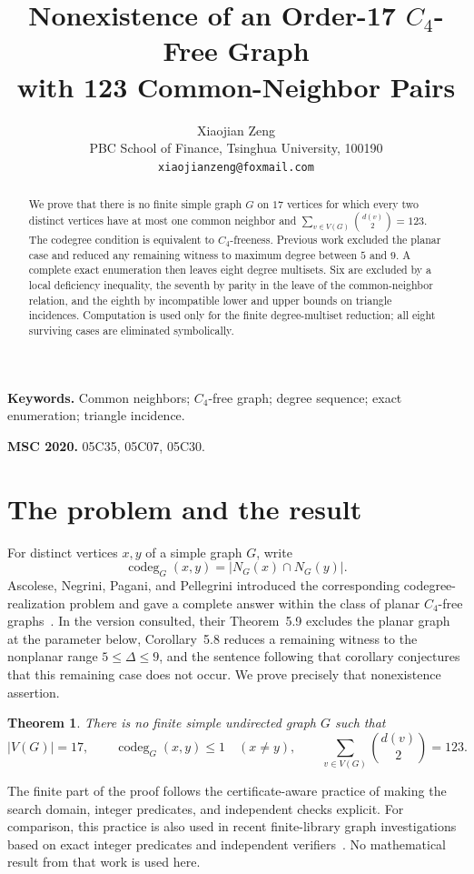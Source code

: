 \documentclass[11pt]{article}
\title{Nonexistence of an Order-17 $C_4$-Free Graph\\
with 123 Common-Neighbor Pairs}
\author{Xiaojian Zeng\\
PBC School of Finance, Tsinghua University, 100190\\
\texttt{xiaojianzeng@foxmail.com}}
\date{}
\newtheorem{theorem}{Theorem}
\newcommand{\codeg}{\operatorname{codeg}}
\begin{document}
\maketitle

\begin{abstract}
We prove that there is no finite simple graph $G$ on $17$ vertices for
which every two distinct vertices have at most one common neighbor and
$\sum_{v\in V(G)}\binom{d(v)}2=123$.  The codegree condition is equivalent
to $C_4$-freeness.  Previous work excluded the planar case and reduced any
remaining witness to maximum degree between $5$ and $9$.  A complete exact
enumeration then leaves eight degree multisets.  Six are excluded by a
local deficiency inequality, the seventh by parity in the leave of the
common-neighbor relation, and the eighth by incompatible lower and upper
bounds on triangle incidences.  Computation is used only for the finite
degree-multiset reduction; all eight surviving cases are eliminated
symbolically.
\end{abstract}

\noindent\textbf{Keywords.}
Common neighbors; $C_4$-free graph; degree sequence; exact enumeration;
triangle incidence.

\medskip
\noindent\textbf{MSC 2020.} 05C35, 05C07, 05C30.

\section{The problem and the result}

For distinct vertices $x,y$ of a simple graph $G$, write
\[
  \codeg_G(x,y)=|N_G(x)\cap N_G(y)|.
\]
Ascolese, Negrini, Pagani, and Pellegrini introduced the corresponding
codegree-realization problem and gave a complete answer within the class of
planar $C_4$-free graphs~\cite{AscoleseEtAl2026}.  In the version consulted,
their Theorem~5.9 excludes the planar graph at the parameter below,
Corollary~5.8 reduces a remaining witness to the nonplanar range
$5\leq\Delta\leq9$, and the sentence following that corollary conjectures
that this remaining case does not occur.  We prove precisely that
nonexistence assertion.

\begin{theorem}\label{thm:main}
There is no finite simple undirected graph $G$ such that
\[
 |V(G)|=17,\qquad
 \codeg_G(x,y)\leq1\quad(x\ne y),\qquad
 \sum_{v\in V(G)}\binom{d(v)}2=123.
\]
\end{theorem}

The finite part of the proof follows the certificate-aware practice of
making the search domain, integer predicates, and independent checks
explicit.  For comparison, this practice is also used in recent
finite-library graph investigations based on exact integer predicates and
independent verifiers~\cite{ZengEtAl2026Certificates}.  No mathematical
result from that work is used here.
\end{document}
